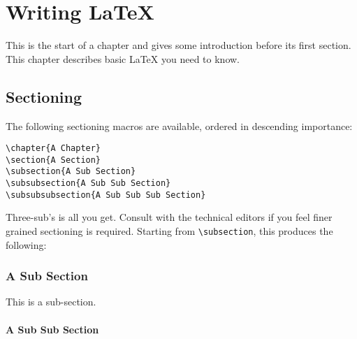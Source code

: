 
\chapter{Writing \LaTeX}

This is the start of a chapter and gives some introduction before its first section.  This chapter describes basic \LaTeX{} you need to know.

\section{Sectioning}
\label{sec:sectioning}

The following sectioning macros are available, ordered in descending
importance:

\begin{verbatim}
\chapter{A Chapter}
\section{A Section}
\subsection{A Sub Section}
\subsubsection{A Sub Sub Section}
\subsubsubsection{A Sub Sub Sub Section}
\end{verbatim}

Three-sub's is all you get.  
Consult with the technical editors if you feel finer grained
sectioning is required.
Starting from \verb|\subsection|, this produces the following:

\subsection{A Sub Section}

This is a sub-section.

\subsubsection{A Sub Sub Section}


